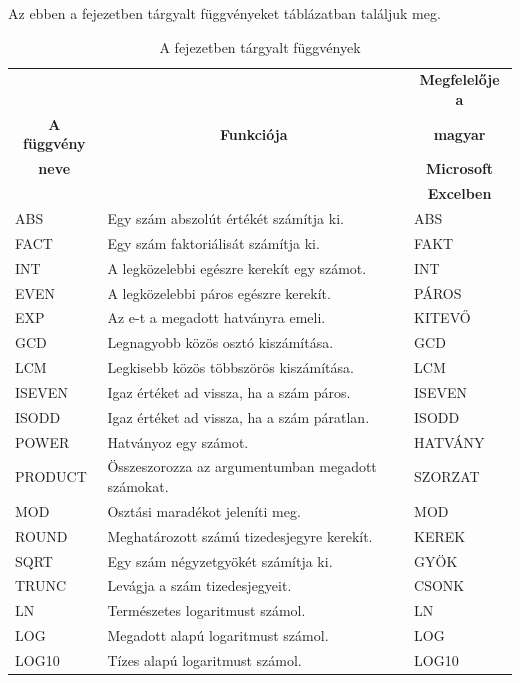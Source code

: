 Az ebben a fejezetben tárgyalt függvényeket 
táblázatban találjuk meg.

\begin{table}[!h]
\begin{center}
\caption{A fejezetben tárgyalt függvények}\label{8-fejezetFüggvények}
\begin{tabular}{|m{2.5cm}|m{8cm}|m{3cm}|}
\hline
 & & \multicolumn{1}{c|}{\textbf{Megfelelője a}} \\
\multicolumn{1}{|c|}{\textbf{A függvény}}&
\multicolumn{1}{c|}{\textbf{Funkciója}}&
\multicolumn{1}{c|}{\textbf{magyar}} \\
\multicolumn{1}{|c|}{\textbf{neve}} & &
\multicolumn{1}{c|}{\textbf{Microsoft}} \\
 & & \multicolumn{1}{c|}{\textbf{Excelben}} \\
\hline
ABS & Egy szám abszolút értékét számítja ki. & ABS\\ \hline
FACT & Egy szám faktoriálisát számítja ki. & FAKT\\ \hline
INT & A legközelebbi egészre kerekít  egy számot. & INT\\ \hline
EVEN & A legközelebbi páros egészre kerekít. & PÁROS\\ \hline
EXP & Az e-t a megadott hatványra emeli. & KITEV\H{O}\\ \hline
GCD & Legnagyobb közös osztó kiszámítása. & GCD\\ \hline
LCM & Legkisebb közös többszörös kiszámítása. & LCM\\ \hline
ISEVEN & Igaz értéket ad vissza, ha a szám páros. & ISEVEN\\ \hline
ISODD & Igaz értéket ad vissza, ha a szám páratlan. & ISODD\\ \hline
POWER & Hatványoz egy számot. & HATVÁNY\\ \hline
PRODUCT & Összeszorozza az argumentumban megadott számokat. & SZORZAT\\ \hline
MOD & Osztási maradékot jeleníti meg. & MOD\\ \hline
ROUND & Meghatározott számú tizedesjegyre kerekít. & KEREK\\ \hline
SQRT & Egy szám négyzetgyökét számítja ki. & GYÖK\\ \hline
TRUNC & Levágja a szám tizedesjegyeit. & CSONK\\ \hline
LN & Természetes logaritmust számol. & LN\\ \hline
LOG & Megadott alapú logaritmust számol. & LOG\\ \hline
LOG10 & Tízes alapú logaritmust számol. & LOG10\\ \hline

\end{tabular}
\end{center}
\end{table}
